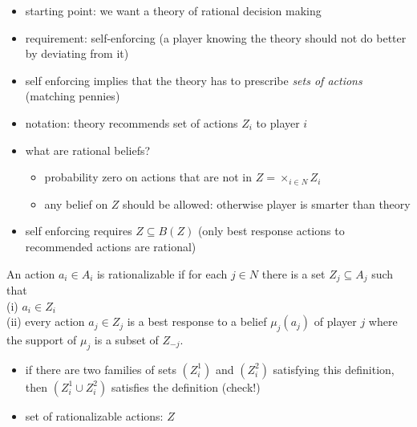 \documentclass[slidestop,serif,compress]{beamer}    %
\theoremstyle{plain}
\theoremstyle{definition}
\newcommand{\fr}{\frame[allowframebreaks]}
\newcommand{\ft}{\frametitle}
\begin{document}
{%
\begin{itemize}
\item starting point: we want a theory of rational decision making
\item requirement: self-enforcing %
(a player knowing the theory should not do better by deviating from it)
\item self enforcing implies that the theory has to prescribe \emph{sets of actions} (matching pennies)%
\item notation: theory recommends set of actions $Z_i$ to player $i$
\item what are rational beliefs? \\
  \begin{itemize}
  \item  probability zero on actions that are not in $Z=\times_{i\in N}Z_i$
\item any belief on $Z$ should be allowed: otherwise player is
    smarter than theory
  \end{itemize}
\item self enforcing requires $Z\subseteq B(Z)$ (only best response actions to recommended actions are rational)
\end{itemize}
\begin{definition}
  An action $a_i\in A_i$ is rationalizable if for each $j\in N$ there is a set $Z_j\subseteq A_j$ such that\\
(i) $a_i\in Z_i$\\
(ii) every action $a_j\in Z_j$ is a best response to a belief $\mu_j(a_j)$ of player $j$ where the support of $\mu_j$ is a subset of $Z_{-j}$.
\end{definition}
\begin{itemize}
\item if there are two families of sets $(Z_i^1)$ and $(Z_i^2)$ satisfying this definition, then $(Z_i^1\cup Z_i^2)$ satisfies the definition (check!)
\item set of rationalizable actions: $Z$
\end{itemize}

}
\end{document}
